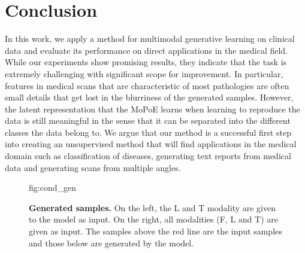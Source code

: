 \documentclass{midl} %
\begin{document}
\section{Conclusion}
In this work, we apply a method for multimodal generative learning on clinical data and evaluate its performance on direct applications in the medical field.
While our experiments show promising results, they indicate that the task is extremely challenging with significant scope for improvement.
In particular, features in medical scans that are characteristic of most pathologies are often small details that get lost in the blurriness of the generated samples.
However, the latent representation that the MoPoE learns when learning to reproduce the data is still meaningful in the sense that it can be separated into the different classes the data belong to.
We argue that our method is a successful first step into creating an unsupervised method that will find applications in the medical domain such as classification of diseases, generating text reports from medical data and generating scans from multiple angles.

 \begin{figure}[htbp]
    \floatconts
    {fig:cond_gen}%
    {\caption{\small{\textbf{Generated samples.} On the left, the L and T modality are given to the model as input. On the right, all modalities (F, L and T) are given as input.
    The samples above the red line are the input samples and those below are generated by the model.}}}%
    {%
    \qquad %
    }
    \end{figure}
\vspace{-0.2in}

\end{document}
